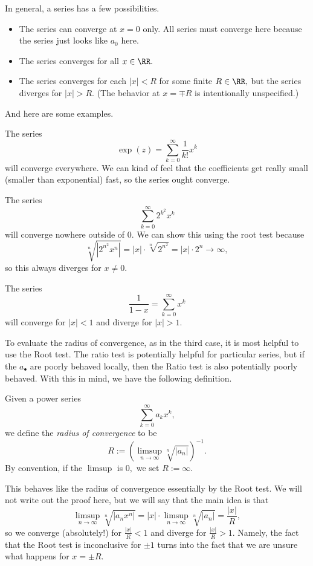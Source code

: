 \documentclass[../notes.tex]{subfiles}
\begin{document}
In general, a series has a few possibilities.
\begin{itemize}
	\item The series can converge at $x=0$ only. All series must converge here because the series just looks like $a_0$ here.
	\item The series converges for all $x\in\RR.$
	\item The series converges for each $|x|<R$ for some finite $R\in\RR,$ but the series diverges for $|x|>R.$ (The behavior at $x=\mp R$ is intentionally unspecified.)
\end{itemize}
And here are some examples.
\begin{example}
	The series
	\[\exp(z)=\sum_{k=0}^\infty\frac1{k!}x^k\]
	will converge everywhere. We can kind of feel that the coefficients get really small (smaller than exponential) fast, so the series ought converge.
\end{example}
\begin{example}
	The series
	\[\sum_{k=0}^\infty2^{k^2}x^k\]
	will converge nowhere outside of $0.$ We can show this using the root test because
	\[\sqrt[n]{|2^{n^2}x^n|}=|x|\cdot\sqrt[n]{2^{n^2}}=|x|\cdot2^n\to\infty,\]
	so this always diverges for $x\ne0.$
\end{example}
\begin{example}
	The series
	\[\frac1{1-x}=\sum_{k=0}^\infty x^k\]
	will converge for $|x|<1$ and diverge for $|x|>1.$
\end{example}
To evaluate the radius of convergence, as in the third case, it is most helpful to use the Root test. The ratio test is potentially helpful for particular series, but if the $a_\bullet$ are poorly behaved locally, then the Ratio test is also potentially poorly behaved. With this in mind, we have the following definition.
\begin{definition}
	Given a power series
	\[\sum_{k=0}^\infty a_kx^k,\]
	we define the \textit{radius of convergence} to be
	\[R:=\left(\limsup_{n\to\infty}\sqrt[n]{|a_n|}\right)^{-1}.\]
	By convention, if the $\limsup$ is $0,$ we set $R:=\infty.$
\end{definition}
This behaves like the radius of convergence essentially by the Root test. We will not write out the proof here, but we will say that the main idea is that
\[\limsup_{n\to\infty}\sqrt[n]{|a_nx^n|}=|x|\cdot\limsup_{n\to\infty}\sqrt[n]{|a_n|}=\frac{|x|}R,\]
so we converge (absolutely!) for $\frac{|x|}R<1$ and diverge for $\frac{|x|}R>1.$ Namely, the fact that the Root test is inconclusive for $\pm1$ turns into the fact that we are unsure what happens for $x=\pm R.$
\end{document}
